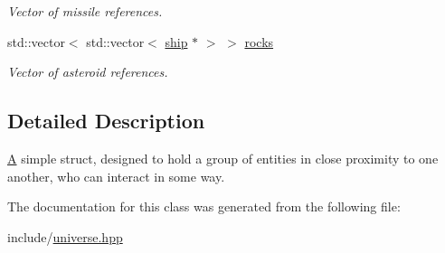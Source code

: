 \begin{DoxyCompactItemize}
\begin{DoxyCompactList}\small\item\em Vector of missile references. \end{DoxyCompactList}\item 
\hypertarget{structcol__partition_a0cc367dfcae1067c859e3445454ca071}{std\-::vector$<$ std\-::vector$<$ \hyperlink{classship}{ship} $\ast$ $>$ $>$ \hyperlink{structcol__partition_a0cc367dfcae1067c859e3445454ca071}{rocks}}\label{structcol__partition_a0cc367dfcae1067c859e3445454ca071}

\begin{DoxyCompactList}\small\item\em Vector of asteroid references. \end{DoxyCompactList}\end{DoxyCompactItemize}


\subsection{Detailed Description}
\hyperlink{struct_a}{A} simple struct, designed to hold a group of entities in close proximity to one another, who can interact in some way. 

The documentation for this class was generated from the following file\-:\begin{DoxyCompactItemize}
\item 
include/\hyperlink{universe_8hpp}{universe.\-hpp}\end{DoxyCompactItemize}
